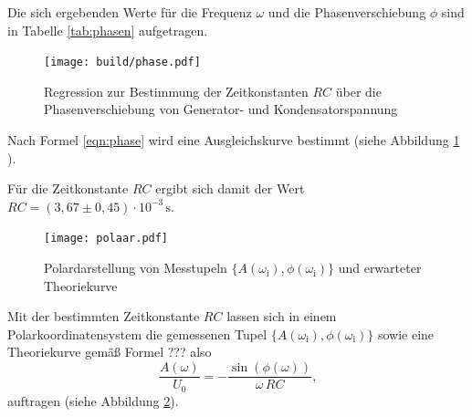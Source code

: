 Die sich ergebenden Werte für die Frequenz $\omega$ und die Phasenverschiebung $\phi$ sind in Tabelle \ref{tab:phasen} aufgetragen.

\begin{figure}
	\centering
	\texttt{[image: build/phase.pdf]}
	\caption{Regression zur Bestimmung der Zeitkonstanten $RC$ über die Phasenverschiebung von Generator- und Kondensatorspannung}
	\label{fig:phasi}
\end{figure}



Nach Formel \eqref{eqn:phase} wird eine Ausgleichskurve bestimmt (siehe Abbildung \ref{fig:phasi}
).

Für die Zeitkonstante $RC$ ergibt sich damit der Wert $RC = (3,67 \pm 0,45) \cdot 10^{-3} \, \si{\second}$.

\begin{figure}
	\centering
	\texttt{[image: polaar.pdf]}
	\caption{Polardarstellung von Messtupeln $\{A(\omega_{\text{i}}), \phi(\omega_{\text{i}}) \}$ und erwarteter Theoriekurve}
	\label{fig:polari}
\end{figure}

Mit der bestimmten Zeitkonstante $RC$ lassen sich in einem Polarkoordinatensystem die gemessenen Tupel $\{A(\omega_{\text{i}}), \phi(\omega_{\text{i}}) \}$ sowie eine Theoriekurve gemäß Formel ??? also
\begin{equation}
	\frac{A({\omega})}{U_0} = - \frac{\sin(\phi(\omega))}{\omega \, RC} \text{,}
\end{equation}
auftragen (siehe Abbildung \ref{fig:polari}).

